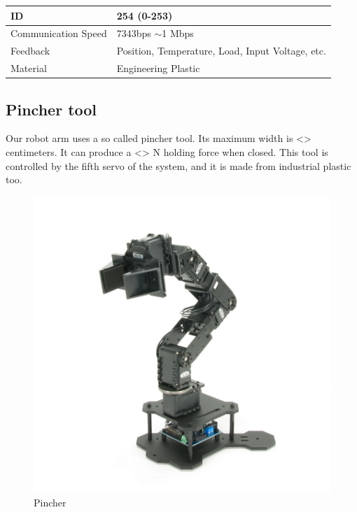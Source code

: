 \begin{table}[ht]
\begin{tabular}{|l|l|}
					ID                   & 254 (0-253)                                                                                                    \\ \hline
					Communication Speed  & 7343bps $\sim$1 Mbps                                                                                           \\ \hline
					Feedback						 & Position, Temperature, Load, Input Voltage, etc.																																\\ \hline
					Material						 & Engineering Plastic																																														\\ \hline
				\end{tabular}
			\end{table}

		\subsection{Pincher tool}
	
			\hspace{15pt}Our robot arm uses a so called pincher tool. Its maximum width is <> centimeters. It can produce a <> N holding force when closed. This tool is controlled by the fifth servo of the system, and it is made from industrial plastic too. \cite{robot_servo} \cite{pincher}
		
				\begin{figure}[ht]
					\centering
					\includegraphics[scale=0.33]{./images/pincher}
					\caption{Pincher \cite{pincher}}
				\end{figure}
	
